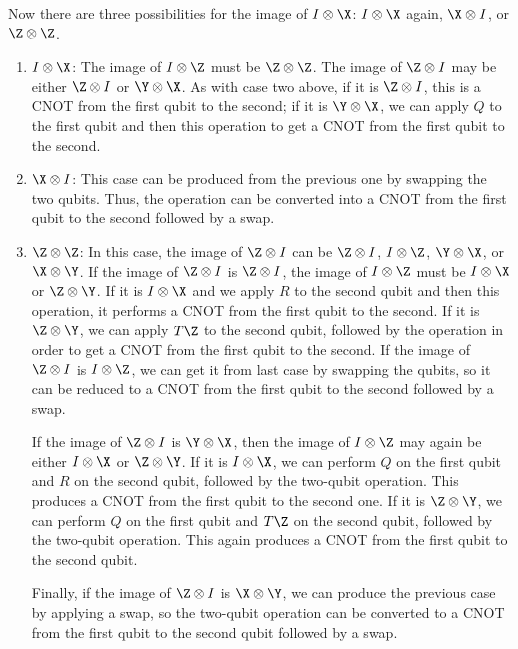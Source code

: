 \begin{itemize}
	Now there are three possibilities for the image of $I \otimes \X$: $I
	\otimes \X$ again, $\X \otimes I$, or $\Z \otimes \Z$.

	\begin{enumerate}
		\item $I \otimes \X$: The image of $I \otimes \Z$ must be $\Z \otimes \Z$.
		The image of $\Z \otimes I$ may be either $\Z \otimes I$ or $\Y \otimes
		\X$.  As with case two above, if it is $\Z \otimes I$, this is a CNOT from the
		first qubit to the second; if it is $\Y \otimes \X$, we can apply $Q$ to the
		first qubit and then this operation to get a CNOT from the first qubit to the
		second.

		\item $\X \otimes I$: This case can be produced from the previous one by
		swapping the two qubits.  Thus, the operation can be converted into a
		CNOT from the first qubit to the second followed by a swap.

		\item $\Z \otimes \Z$: In this case, the image of $\Z \otimes I$ can be $\Z
		\otimes I$, $I \otimes \Z$, $\Y \otimes \X$, or $\X \otimes \Y$.  If the
		image of $\Z \otimes I$ is $\Z \otimes I$, the image of $I \otimes \Z$ must
		be $I \otimes \X$ or $\Z \otimes \Y$.  If it is $I \otimes \X$ and we apply
		$R$ to the second qubit and then this operation, it performs a CNOT from the
		first qubit to the second.  If it is $\Z \otimes \Y$, we can apply $T \Z$
		to the second qubit, followed by the operation in order to get a CNOT
		from the first qubit to the second.  If the image of $\Z \otimes I$ is $I
		\otimes \Z$, we can get it from last case by swapping the qubits, so it can be
		reduced to a CNOT from the first qubit to the second followed by a swap.

		If the image of $\Z \otimes I$ is $\Y \otimes \X$, then the image of $I
		\otimes \Z$ may again be either $I \otimes \X$ or $\Z \otimes \Y$.  If it is $I
		\otimes \X$, we can perform $Q$ on the first qubit and $R$ on the second
		qubit, followed by the two-qubit operation.  This produces a CNOT from the
		first qubit to the second one.  If it is $\Z \otimes \Y$, we can perform $Q$
		on the first qubit and $T \Z$ on the second qubit, followed by the
		two-qubit operation.  This again produces a CNOT from the first qubit to
		the second qubit.

		Finally, if the image of $\Z \otimes I$ is $\X \otimes \Y$, we can produce
		the previous case by applying a swap, so the two-qubit operation can be
		converted to a CNOT from the first qubit to the second qubit followed by a
		swap.
	\end{enumerate}
\end{itemize}

